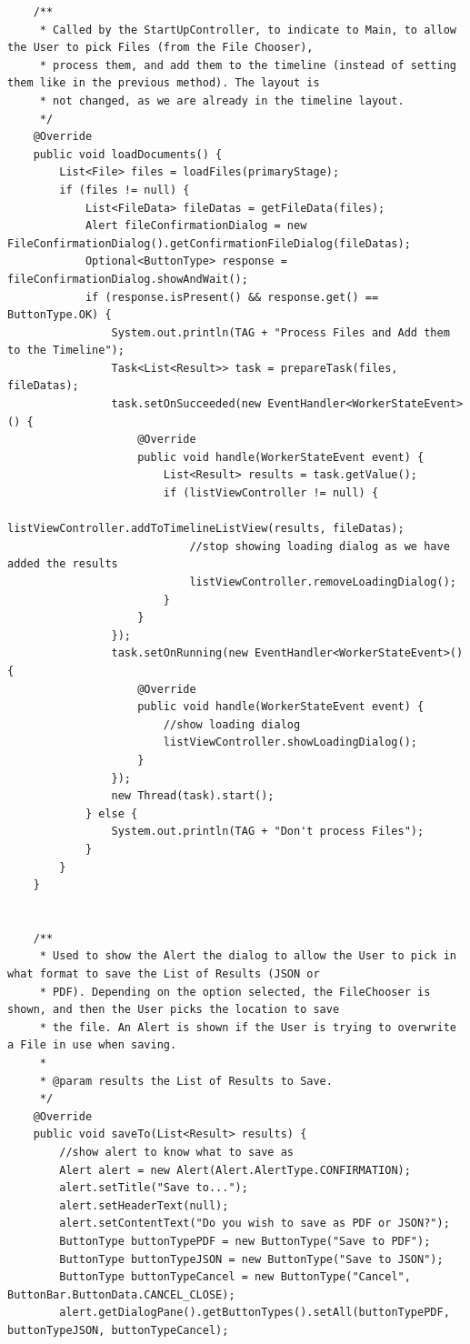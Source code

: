 \begin{lstlisting}
    /**
     * Called by the StartUpController, to indicate to Main, to allow the User to pick Files (from the File Chooser),
     * process them, and add them to the timeline (instead of setting them like in the previous method). The layout is
     * not changed, as we are already in the timeline layout.
     */
    @Override
    public void loadDocuments() {
        List<File> files = loadFiles(primaryStage);
        if (files != null) {
            List<FileData> fileDatas = getFileData(files);
            Alert fileConfirmationDialog = new FileConfirmationDialog().getConfirmationFileDialog(fileDatas);
            Optional<ButtonType> response = fileConfirmationDialog.showAndWait();
            if (response.isPresent() && response.get() == ButtonType.OK) {
                System.out.println(TAG + "Process Files and Add them to the Timeline");
                Task<List<Result>> task = prepareTask(files, fileDatas);
                task.setOnSucceeded(new EventHandler<WorkerStateEvent>() {
                    @Override
                    public void handle(WorkerStateEvent event) {
                        List<Result> results = task.getValue();
                        if (listViewController != null) {
                            listViewController.addToTimelineListView(results, fileDatas);
                            //stop showing loading dialog as we have added the results
                            listViewController.removeLoadingDialog();
                        }
                    }
                });
                task.setOnRunning(new EventHandler<WorkerStateEvent>() {
                    @Override
                    public void handle(WorkerStateEvent event) {
                        //show loading dialog
                        listViewController.showLoadingDialog();
                    }
                });
                new Thread(task).start();
            } else {
                System.out.println(TAG + "Don't process Files");
            }
        }
    }


    /**
     * Used to show the Alert the dialog to allow the User to pick in what format to save the List of Results (JSON or
     * PDF). Depending on the option selected, the FileChooser is shown, and then the User picks the location to save
     * the file. An Alert is shown if the User is trying to overwrite a File in use when saving.
     *
     * @param results the List of Results to Save.
     */
    @Override
    public void saveTo(List<Result> results) {
        //show alert to know what to save as
        Alert alert = new Alert(Alert.AlertType.CONFIRMATION);
        alert.setTitle("Save to...");
        alert.setHeaderText(null);
        alert.setContentText("Do you wish to save as PDF or JSON?");
        ButtonType buttonTypePDF = new ButtonType("Save to PDF");
        ButtonType buttonTypeJSON = new ButtonType("Save to JSON");
        ButtonType buttonTypeCancel = new ButtonType("Cancel", ButtonBar.ButtonData.CANCEL_CLOSE);
        alert.getDialogPane().getButtonTypes().setAll(buttonTypePDF, buttonTypeJSON, buttonTypeCancel);


\end{lstlisting}
